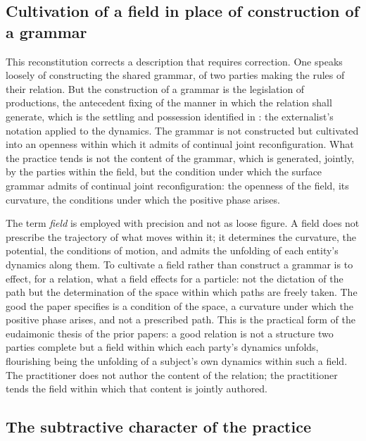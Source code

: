 \subsection{Cultivation of a field in place of construction of a grammar}
\label{p10:sec:field-not-grammar}

This reconstitution corrects a description that requires correction. One speaks loosely of constructing the shared grammar, of two parties making the rules of their relation. But the construction of a grammar is the legislation of productions, the antecedent fixing of the manner in which the relation shall generate, which is the settling and possession identified in : the externalist's notation applied to the dynamics. The grammar is not constructed but cultivated into an openness within which it admits of continual joint reconfiguration. What the practice tends is not the content of the grammar, which is generated, jointly, by the parties within the field, but the condition under which the surface grammar admits of continual joint reconfiguration: the openness of the field, its curvature, the conditions under which the positive phase arises.

The term \emph{field} is employed with precision and not as loose figure. A field does not prescribe the trajectory of what moves within it; it determines the curvature, the potential, the conditions of motion, and admits the unfolding of each entity's dynamics along them. To cultivate a field rather than construct a grammar is to effect, for a relation, what a field effects for a particle: not the dictation of the path but the determination of the space within which paths are freely taken. The good the paper specifies is a condition of the space, a curvature under which the positive phase arises, and not a prescribed path. This is the practical form of the eudaimonic thesis of the prior papers: a good relation is not a structure two parties complete but a field within which each party's dynamics unfolds, flourishing being the unfolding of a subject's own dynamics within such a field. The practitioner does not author the content of the relation; the practitioner tends the field within which that content is jointly authored.

\subsection{The subtractive character of the practice}
\label{p10:sec:subtractive}

